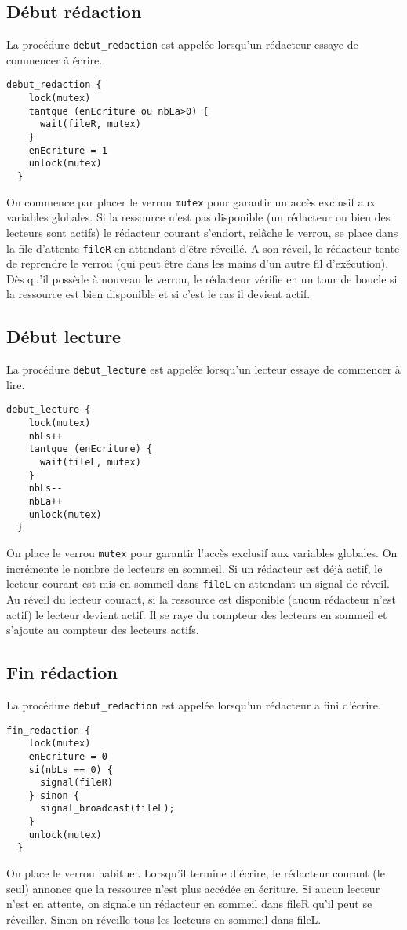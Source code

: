 \documentclass[11pt]{article}
\theoremstyle{definition}
\theoremstyle{definition}
\begin{document}
\subsection{Début rédaction}
La procédure \texttt{debut\_redaction} est appelée lorsqu'un rédacteur essaye de commencer à écrire.
\begin{lstlisting}[columns=fixed,basicstyle=\small\ttfamily]
  debut_redaction {
    lock(mutex)
    tantque (enEcriture ou nbLa>0) {
      wait(fileR, mutex)
    }
    enEcriture = 1
    unlock(mutex)
  }
\end{lstlisting}
On commence par placer le verrou \texttt{mutex} pour garantir un accès exclusif aux variables globales.
Si la ressource n'est pas disponible (un rédacteur ou bien des lecteurs sont actifs) le rédacteur courant s'endort, relâche le verrou, se place dans la file d'attente \texttt{fileR} en attendant d'être réveillé. A son réveil, le rédacteur tente de reprendre le verrou (qui peut être dans les mains d'un autre fil d'exécution). Dès qu'il possède à nouveau le verrou, le rédacteur vérifie en un tour de boucle si la ressource est bien disponible et si c'est le cas il devient actif.

\subsection{Début lecture}
La procédure \texttt{debut\_lecture} est appelée lorsqu'un lecteur essaye de commencer à lire.
\begin{lstlisting}[columns=fixed,basicstyle=\small\ttfamily]
  debut_lecture {
    lock(mutex)
    nbLs++
    tantque (enEcriture) {
      wait(fileL, mutex)
    }
    nbLs--
    nbLa++
    unlock(mutex)
  }
\end{lstlisting}
On place le verrou \texttt{mutex} pour garantir l'accès exclusif aux variables globales.
On incrémente le nombre de lecteurs en sommeil.
Si un rédacteur est déjà actif, le lecteur courant est mis en sommeil dans \texttt{fileL} en attendant un signal de réveil.
Au réveil du lecteur courant, si la ressource est disponible (aucun rédacteur n'est actif) le lecteur devient actif. Il se raye du compteur des lecteurs en sommeil et s'ajoute au compteur des lecteurs actifs.

\subsection{Fin rédaction}
La procédure \texttt{debut\_redaction} est appelée lorsqu'un rédacteur a fini d'écrire.
\begin{lstlisting}[columns=fixed,basicstyle=\small\ttfamily]
  fin_redaction {
    lock(mutex)
    enEcriture = 0
    si(nbLs == 0) {
      signal(fileR)
    } sinon {
      signal_broadcast(fileL);
    }
    unlock(mutex)
  }
\end{lstlisting}
On place le verrou habituel.
Lorsqu'il termine d'écrire, le rédacteur courant (le seul) annonce que la ressource n'est plus accédée en écriture. Si aucun lecteur n'est en attente, on signale un rédacteur en sommeil dans fileR qu'il peut se réveiller. Sinon on réveille tous les lecteurs en sommeil dans fileL.
\end{document}
